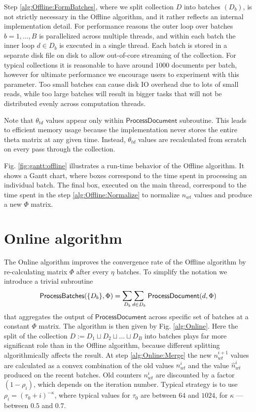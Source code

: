 \documentclass[russian,english]{llncs}
\newcommand{\kw}[1]{\textsf{#1}}
\begin{document}
Step \ref{alg:Offline:FormBatches}, where we split collection $D$ into batches $(D_b)$, is not strictly necessary in the \kw{Offline algorithm},
and it rather reflects an internal implementation detail.
For performance reasons the outer loop over batches $b = 1, \dots, B$ is parallelized across multiple threads,
and within each batch the inner loop $d \in D_b$ is executed in a single thread.
Each batch is stored in a separate disk file on disk to allow out-of-core streaming of the collection.
For typical collections it is reasonable to have around $1000$ documents per batch,
however for ultimate performance we encourage users to experiment with this parameter.
Too small batches can cause disk IO overhead due to lots of small reads,
while too large batches will result in bigger tasks that will not be distributed evenly across computation threads.

Note that $\theta_{td}$ values appear only within $\kw{ProcessDocument}$ subroutine.
This leads to efficient memory usage because the implementation never stores the entire theta matrix at any given time.
Instead, $\theta_{td}$ values are recalculated from scratch on every pass through the collection.

Fig. \ref{fig:gantt:offline} illustrates a run-time behavior of the \kw{Offline algorithm}.
It shows a Gantt chart, where boxes correspond to the time spent in processing an individual batch.
The final box, executed on the main thread, correspond to the time spent in the step \ref{alg:Offline:Normalize}
to normalize $n_{wt}$ values and produce a new $\Phi$ matrix.

\section{Online algorithm}
\label{sec:Online}

The \kw{Online algorithm} improves the convergence rate of the \kw{Offline algorithm}
by re-calculating matrix $\Phi$ after every $\eta$ batches.
To simplify the notation
we introduce a trivial subroutine
\[
\kw{ProcessBatches}(\{D_b\}, \Phi) = \mathlarger\sum\limits_{D_b} \mathlarger\sum\limits_{d \in D_b} \; \kw{ProcessDocument}(d, \Phi) \\
\]
that aggregates the output of $\kw{ProcessDocument}$ across specific set of batches at a constant $\Phi$ matrix.
The algorithm is then given by Fig. \ref{alg:Online}.
Here the split of the collection $D := D_1 \sqcup D_2 \sqcup \dots \sqcup D_B$
into batches
plays far more significant role than in the \kw{Offline algorithm},
because different splitting algorithmically affects the result.
At step \ref{alg:Online:Merge} the new $n_{wt}^{i+1}$ values are calculated as a convex combination
of the old values $n_{wt}^{i}$ and the value $\hat n_{wt}^{i}$ produced on the recent batches.
Old counters $n_{wt}^{i}$ are discounted by a factor $(1 - \rho_i)$,
which depends on the iteration number. Typical strategy is to use $\rho_i = (\tau_0 + i)^{-\kappa}$,
where typical values for $\tau_0$ are between $64$ and $1024$, for $\kappa$ --- between $0.5$ and $0.7$.
\end{document}

